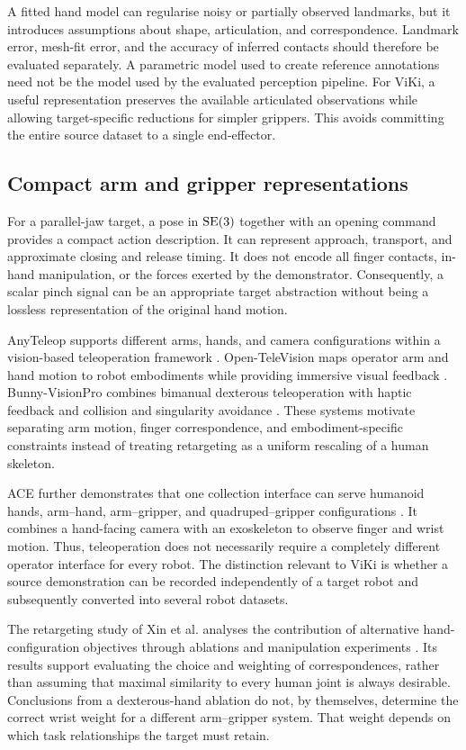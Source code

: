 A fitted hand model can regularise noisy or partially observed landmarks, but
it introduces assumptions about shape, articulation, and correspondence.
Landmark error, mesh-fit error, and the accuracy of inferred contacts should
therefore be evaluated separately. A parametric model used to create reference
annotations need not be the model used by the evaluated perception pipeline.
For ViKi, a useful representation preserves the available articulated
observations while allowing target-specific reductions for simpler grippers.
This avoids committing the entire source dataset to a single end-effector.

\subsection{Compact arm and gripper representations}

For a parallel-jaw target, a pose in $\mathrm{SE}(3)$ together with an opening command
provides a compact action description. It can represent approach, transport,
and approximate closing and release timing. It does not encode all finger
contacts, in-hand manipulation, or the forces exerted by the demonstrator.
Consequently, a scalar pinch signal can be an appropriate target abstraction
without being a lossless representation of the original hand motion.

AnyTeleop supports different arms, hands, and camera configurations within a
vision-based teleoperation framework \cite{anyteleop}. Open-TeleVision maps
operator arm and hand motion to robot embodiments while providing immersive
visual feedback \cite{opentv}. Bunny-VisionPro combines bimanual dexterous
teleoperation with haptic feedback and collision and singularity avoidance
\cite{bunny}. These systems motivate separating arm motion, finger
correspondence, and embodiment-specific constraints instead of treating
retargeting as a uniform rescaling of a human skeleton.

ACE further demonstrates that one collection interface can serve humanoid
hands, arm--hand, arm--gripper, and quadruped--gripper configurations
\cite{ace}. It combines a hand-facing camera with an exoskeleton to observe
finger and wrist motion. Thus, teleoperation does not necessarily require a
completely different operator interface for every robot. The distinction
relevant to ViKi is whether a source demonstration can be recorded independently
of a target robot and subsequently converted into several robot datasets.

The retargeting study of Xin et al. analyses the contribution of alternative
hand-configuration objectives through ablations and manipulation experiments
\cite{keyobj}. Its results support evaluating the choice and weighting of
correspondences, rather than assuming that maximal similarity to every human
joint is always desirable. Conclusions from a dexterous-hand ablation do not,
by themselves, determine the correct wrist weight for a different arm--gripper
system. That weight depends on which task relationships the target must retain.

